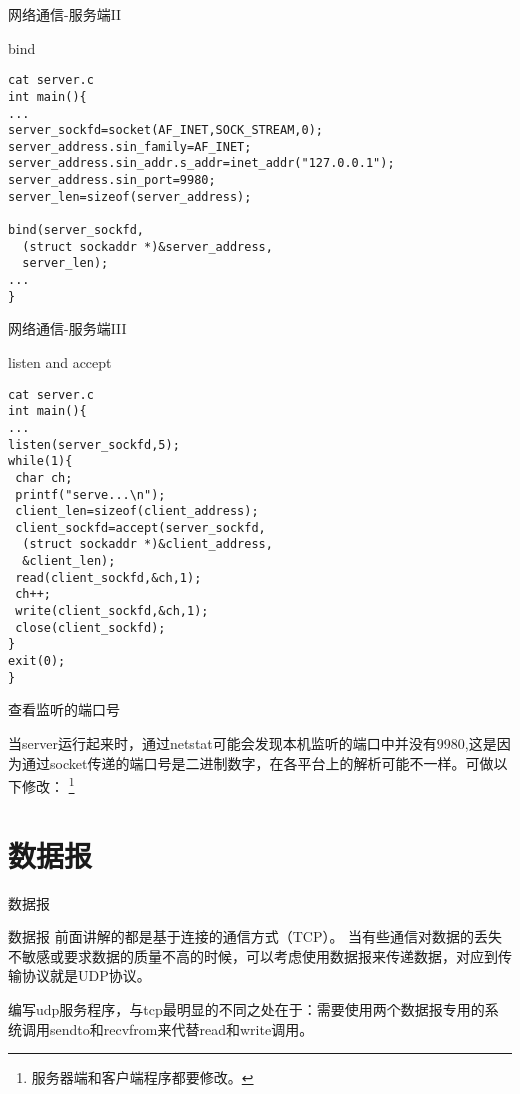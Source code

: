\documentclass{beamer}
\begin{document}
\begin{frame}[fragile]{网络通信-服务端II}
\begin{block}{bind}
\begin{verbatim}
cat server.c
int main(){
...
server_sockfd=socket(AF_INET,SOCK_STREAM,0);
server_address.sin_family=AF_INET;
server_address.sin_addr.s_addr=inet_addr("127.0.0.1");
server_address.sin_port=9980;
server_len=sizeof(server_address);

bind(server_sockfd,
  (struct sockaddr *)&server_address, 
  server_len);
...
}

\end{verbatim}
\end{block}
\end{frame}



\begin{frame}[fragile]{网络通信-服务端III}
\begin{block}{listen and accept}
\begin{verbatim}
cat server.c
int main(){
...
listen(server_sockfd,5);
while(1){
 char ch;
 printf("serve...\n");
 client_len=sizeof(client_address);
 client_sockfd=accept(server_sockfd,
  (struct sockaddr *)&client_address,
  &client_len);
 read(client_sockfd,&ch,1);
 ch++;
 write(client_sockfd,&ch,1);
 close(client_sockfd);
}
exit(0);
}

\end{verbatim}
\end{block}
\end{frame}

\begin{frame}[fragile]{查看监听的端口号}

当server运行起来时，通过netstat可能会发现本机监听的端口中并没有9980,这是因为通过socket传递的端口号是二进制数字，在各平台上的解析可能不一样。可做以下修改：
\footnote{服务器端和客户端程序都要修改。}
\end{frame}
\section{数据报}
\begin{frame}
\Huge{\centerline{数据报}}
\end{frame}
\begin{frame}{数据报}
前面讲解的都是基于连接的通信方式（TCP）。
当有些通信对数据的丢失不敏感或要求数据的质量不高的时候，可以考虑使用数据报来传递数据，对应到传输协议就是UDP协议。

编写udp服务程序，与tcp最明显的不同之处在于：需要使用两个数据报专用的系统调用sendto和recvfrom来代替read和write调用。
\end{frame}
\end{document}
